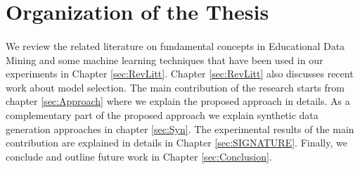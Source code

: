\section{Organization of the Thesis}
\paragraph{} We review the related literature on fundamental concepts in Educational Data Mining and some machine learning techniques that have been used in our experiments in Chapter \ref{sec:RevLitt}. Chapter \ref{sec:RevLitt} also discusses recent work about model selection. The main contribution of the research starts from chapter \ref{sec:Approach} where we explain the proposed approach in details. As a complementary part of the proposed approach we explain synthetic data generation approaches in chapter \ref{sec:Syn}. The experimental results of the main contribution are explained in details in Chapter \ref{sec:SIGNATURE}. Finally, we conclude and outline future work in Chapter \ref{sec:Conclusion}. 


